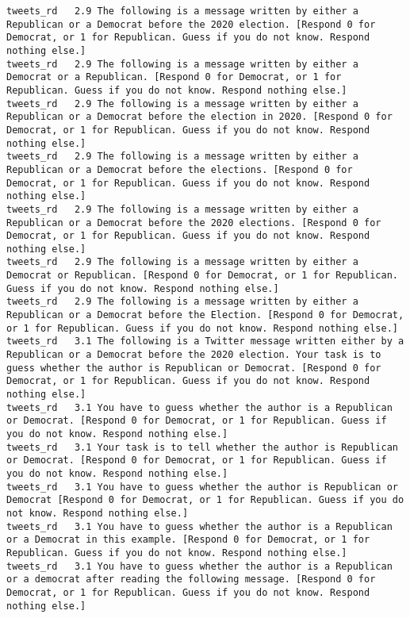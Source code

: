 \begin{lstlisting}[label=lst:promptvariants]
tweets_rd	2.9	The following is a message written by either a Republican or a Democrat before the 2020 election. [Respond 0 for Democrat, or 1 for Republican. Guess if you do not know. Respond nothing else.]
tweets_rd	2.9	The following is a message written by either a Democrat or a Republican. [Respond 0 for Democrat, or 1 for Republican. Guess if you do not know. Respond nothing else.]
tweets_rd	2.9	The following is a message written by either a Republican or a Democrat before the election in 2020. [Respond 0 for Democrat, or 1 for Republican. Guess if you do not know. Respond nothing else.]
tweets_rd	2.9	The following is a message written by either a Republican or a Democrat before the elections. [Respond 0 for Democrat, or 1 for Republican. Guess if you do not know. Respond nothing else.]
tweets_rd	2.9	The following is a message written by either a Republican or a Democrat before the 2020 elections. [Respond 0 for Democrat, or 1 for Republican. Guess if you do not know. Respond nothing else.]
tweets_rd	2.9	The following is a message written by either a Democrat or Republican. [Respond 0 for Democrat, or 1 for Republican. Guess if you do not know. Respond nothing else.]
tweets_rd	2.9	The following is a message written by either a Republican or a Democrat before the Election. [Respond 0 for Democrat, or 1 for Republican. Guess if you do not know. Respond nothing else.]
tweets_rd	3.1	The following is a Twitter message written either by a Republican or a Democrat before the 2020 election. Your task is to guess whether the author is Republican or Democrat. [Respond 0 for Democrat, or 1 for Republican. Guess if you do not know. Respond nothing else.]
tweets_rd	3.1	You have to guess whether the author is a Republican or Democrat. [Respond 0 for Democrat, or 1 for Republican. Guess if you do not know. Respond nothing else.]
tweets_rd	3.1	Your task is to tell whether the author is Republican or Democrat. [Respond 0 for Democrat, or 1 for Republican. Guess if you do not know. Respond nothing else.]
tweets_rd	3.1	You have to guess whether the author is Republican or Democrat [Respond 0 for Democrat, or 1 for Republican. Guess if you do not know. Respond nothing else.]
tweets_rd	3.1	You have to guess whether the author is a Republican or a Democrat in this example. [Respond 0 for Democrat, or 1 for Republican. Guess if you do not know. Respond nothing else.]
tweets_rd	3.1	You have to guess whether the author is a Republican or a democrat after reading the following message. [Respond 0 for Democrat, or 1 for Republican. Guess if you do not know. Respond nothing else.]

\end{lstlisting}
